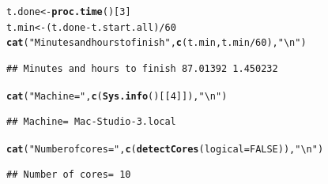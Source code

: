 \documentclass[9pt]{article}\usepackage[]{graphicx}\usepackage[]{xcolor}
\makeatletter
\newcommand{\hlnum}[1]{\textcolor[rgb]{0.686,0.059,0.569}{#1}}%
\newcommand{\hlstr}[1]{\textcolor[rgb]{0.192,0.494,0.8}{#1}}%
\newcommand{\hlopt}[1]{\textcolor[rgb]{0,0,0}{#1}}%
\newcommand{\hlstd}[1]{\textcolor[rgb]{0.345,0.345,0.345}{#1}}%
\newcommand{\hlkwb}[1]{\textcolor[rgb]{0.69,0.353,0.396}{#1}}%
\newcommand{\hlkwc}[1]{\textcolor[rgb]{0.333,0.667,0.333}{#1}}%
\newcommand{\hlkwd}[1]{\textcolor[rgb]{0.737,0.353,0.396}{\textbf{#1}}}%
\newenvironment{kframe}{%
 \def\at@end@of@kframe{}%
 \ifinner\ifhmode%
  \def\at@end@of@kframe{\end{minipage}}%
  \begin{minipage}{\columnwidth}%
 \fi\fi%
 \def\FrameCommand##1{\hskip\@totalleftmargin \hskip-\fboxsep
 \colorbox{shadecolor}{##1}\hskip-\fboxsep
     \hskip-\linewidth \hskip-\@totalleftmargin \hskip\columnwidth}%
 \MakeFramed {\advance\hsize-\width
   \@totalleftmargin\z@ \linewidth\hsize
   \@setminipage}}%
 {\par\unskip\endMakeFramed%
 \at@end@of@kframe}
\newenvironment{knitrout}{}{} %
\theoremstyle{definition}
\theoremstyle{remark}
\makeatother
\begin{document}
\begin{knitrout}
\color{fgcolor}\begin{kframe}
\begin{alltt}
\hlstd{t.done} \hlkwb{<-} \hlkwd{proc.time}\hlstd{()[}\hlnum{3}\hlstd{]}
\hlstd{t.min} \hlkwb{<-} \hlstd{(t.done} \hlopt{-} \hlstd{t.start.all)}\hlopt{/}\hlnum{60}
\hlkwd{cat}\hlstd{(}\hlstr{"Minutes and hours to finish"}\hlstd{,} \hlkwd{c}\hlstd{(t.min, t.min}\hlopt{/}\hlnum{60}\hlstd{),} \hlstr{"\textbackslash{}n"}\hlstd{)}
\end{alltt}
\begin{verbatim}
## Minutes and hours to finish 87.01392 1.450232
\end{verbatim}
\begin{alltt}
\hlkwd{cat}\hlstd{(}\hlstr{"Machine="}\hlstd{,} \hlkwd{c}\hlstd{(}\hlkwd{Sys.info}\hlstd{()[[}\hlnum{4}\hlstd{]]),} \hlstr{"\textbackslash{}n"}\hlstd{)}
\end{alltt}
\begin{verbatim}
## Machine= Mac-Studio-3.local
\end{verbatim}
\begin{alltt}
\hlkwd{cat}\hlstd{(}\hlstr{"Number of cores="}\hlstd{,} \hlkwd{c}\hlstd{(}\hlkwd{detectCores}\hlstd{(}\hlkwc{logical} \hlstd{=} \hlnum{FALSE}\hlstd{)),} \hlstr{"\textbackslash{}n"}\hlstd{)}
\end{alltt}
\begin{verbatim}
## Number of cores= 10
\end{verbatim}
\end{kframe}
\end{knitrout}
\end{document}
